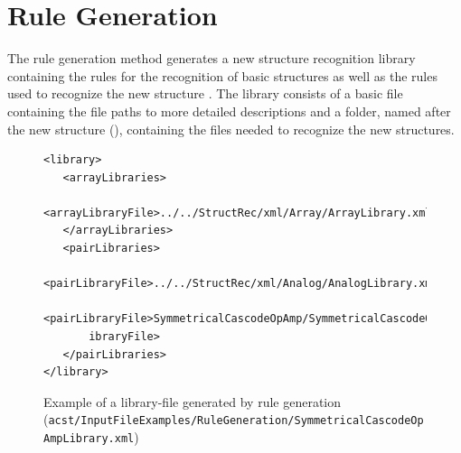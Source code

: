 \section{Rule Generation}\label{sec:OutputFilesRuleGeneration}
The rule generation method generates a new structure recognition library containing the rules for the recognition of basic structures as well as the rules used to recognize the new structure {\tt <structure-name>}. The library consists of a basic file containing the file paths to more detailed descriptions and a folder, named after the new structure ({\tt <structure-name>}), containing the files needed to recognize the new structures.

\begin{figure}[H]
	\begin{lstlisting}[basicstyle=\ttfamily\scriptsize,backgroundcolor={\color{gray!30}}, escapechar=? ]
<library>
   <arrayLibraries>
      <arrayLibraryFile>../../StructRec/xml/Array/ArrayLibrary.xml</arrayLibraryFile>
   </arrayLibraries>
   <pairLibraries>
      <pairLibraryFile>../../StructRec/xml/Analog/AnalogLibrary.xml</pairLibraryFile>
      <pairLibraryFile>SymmetricalCascodeOpAmp/SymmetricalCascodeOpAmpLibrary.xml</pairL
       ibraryFile>
   </pairLibraries>
</library>
	\end{lstlisting}
	\caption{Example of a library-file generated by rule generation ({\tt acst/\protect \linebreak InputFileExamples/RuleGeneration/SymmetricalCascodeOpAmpLibrary.xml})}
\end{figure}

